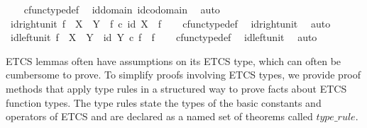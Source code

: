\begin{isabellebody}
%
\isadelimproof
\ \ %
\endisadelimproof
%
\isatagproof
{}\isamarkupfalse%
\ cfunc{\isacharunderscore}{\kern0pt}type{\isacharunderscore}{\kern0pt}def\ \isamarkupfalse%
\ id{\isacharunderscore}{\kern0pt}domain\ id{\isacharunderscore}{\kern0pt}codomain\ \isamarkupfalse%
\ auto%
\endisatagproof
{\isafoldproof}%
%
\isadelimproof
\isanewline
%
\endisadelimproof
\isanewline
{}\isamarkupfalse%
\ id{\isacharunderscore}{\kern0pt}right{\isacharunderscore}{\kern0pt}unit{}{\isacharcolon}{\kern0pt}\ {\isachardoublequoteopen}f\ {\isacharcolon}{\kern0pt}\ X\ {\isasymrightarrow}\ Y\ {\isasymLongrightarrow}\ f\ {\isasymcirc}\isactrlsub c\ id\ X\ {\isacharequal}{\kern0pt}\ f{\isachardoublequoteclose}\isanewline
%
\isadelimproof
\ \ %
\endisadelimproof
%
\isatagproof
{}\isamarkupfalse%
\ cfunc{\isacharunderscore}{\kern0pt}type{\isacharunderscore}{\kern0pt}def\ \isamarkupfalse%
\ id{\isacharunderscore}{\kern0pt}right{\isacharunderscore}{\kern0pt}unit\ \isamarkupfalse%
\ auto%
\endisatagproof
{\isafoldproof}%
%
\isadelimproof
\isanewline
%
\endisadelimproof
\isanewline
{}\isamarkupfalse%
\ id{\isacharunderscore}{\kern0pt}left{\isacharunderscore}{\kern0pt}unit{}{\isacharcolon}{\kern0pt}\ {\isachardoublequoteopen}f\ {\isacharcolon}{\kern0pt}\ X\ {\isasymrightarrow}\ Y\ {\isasymLongrightarrow}\ id\ Y\ {\isasymcirc}\isactrlsub c\ f\ {\isacharequal}{\kern0pt}\ f{\isachardoublequoteclose}\isanewline
%
\isadelimproof
\ \ %
\endisadelimproof
%
\isatagproof
{}\isamarkupfalse%
\ cfunc{\isacharunderscore}{\kern0pt}type{\isacharunderscore}{\kern0pt}def\ \isamarkupfalse%
\ id{\isacharunderscore}{\kern0pt}left{\isacharunderscore}{\kern0pt}unit\ \isamarkupfalse%
\ auto%
\endisatagproof
{\isafoldproof}%
%
\isadelimproof
%
\endisadelimproof
%
\isadelimdocument
%
\endisadelimdocument
%
\isatagdocument
%
\isamarkuptrue%
%
\endisatagdocument
{\isafolddocument}%
%
\isadelimdocument
%
\endisadelimdocument
%
\begin{isamarkuptext}%
ETCS lemmas often have assumptions on its ETCS type, which can often be cumbersome to prove.
  To simplify proofs involving ETCS types, we provide proof methods that apply type rules in a
  structured way to prove facts about ETCS function types.
  The type rules state the types of the basic constants and operators of ETCS and are declared as
  a named set of theorems called $type\_rule$.%

\end{isamarkuptext}
\end{isabellebody}
